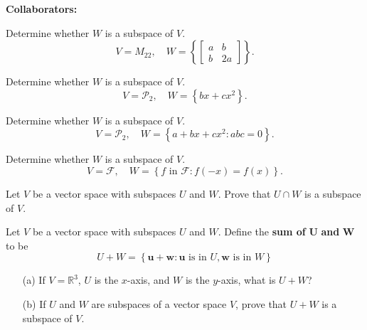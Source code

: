 \documentclass[11pt,letterpaper,boxed]{hmcpset}
\newcommand{\R}{\mathbb{R}}
\newcommand{\crb}[1]{\left\{ #1 \right\}}
\newcommand{\VEC}[1]{\ensuremath{\mathbf{#1}}\xspace}
\begin{document}
\noindent\textbf{Collaborators:} 


\begin{problem}[Poole 6.1 \#28]
Determine whether $W$ is a subspace of $V$.
\[
	V = M_{22}, \quad W = \crb{\begin{bmatrix}a & b\\b & 2a\end{bmatrix}}.
\]
\end{problem}

\begin{solution}
\vfill
\end{solution}
\newpage

\begin{problem}[Poole 6.1 \#34]
Determine whether $W$ is a subspace of $V$.
\[
	V = \mathscr{P}_2, \quad W = \crb{bx+cx^2}.
\]
\end{problem}

\begin{solution}
\vfill
\end{solution}
\newpage

\begin{problem}[Poole 6.1 \#36]
Determine whether $W$ is a subspace of $V$.
\[
	V = \mathscr{P}_2, \quad W = \crb{a+bx+cx^2: abc=0}.
\]
\end{problem}

\begin{solution}
\vfill
\end{solution}
\newpage

\begin{problem}[Poole 6.1 \#38]
Determine whether $W$ is a subspace of $V$.
\[
	V = \mathscr{F}, \quad W = \crb{f \text{ in } \mathscr{F}: f(-x)=f(x)}.
\]
\end{problem}

\begin{solution}
\vfill
\end{solution}
\newpage

\begin{problem}[Poole 6.1 \#46]
Let $V$ be a vector space with subspaces $U$ and $W$. Prove that $U \cap W$ is a subspace of $V$.
\end{problem}

\begin{solution}
\vfill
\end{solution}
\newpage

\begin{problem}[Poole 6.1 \#48]
Let $V$ be a vector space with subspaces $U$ and $W$. Define the \textbf{sum of} $\mathbf{U}$ \textbf{and} $\mathbf{W}$ to be
\[
	U+W = \crb{\VEC{u} + \VEC{w}: \VEC{u} \text{ is in } U, \VEC{w} \text{ is in } W}
\]
\begin{enumerate}
\item[(a)] If $V = \R^3$, $U$ is the $x$-axis, and $W$ is the $y$-axis, what is $U+W$?
\item[(b)] If $U$ and $W$ are subspaces of a vector space $V$, prove that $U+W$ is a subspace of $V$.
\end{enumerate}
\end{problem}
\end{document}
